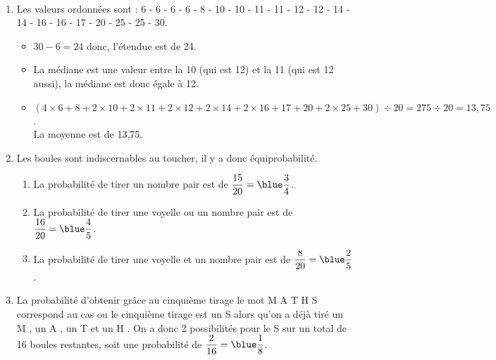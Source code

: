 \ \\ [-5mm]
   \begin{enumerate}
      \item Les valeurs ordonnées sont : 6 - 6 - 6 - 6 - 8 - 10 - 10 - 11 - 11 - 12 - 12 - 14 - 14 - 16 - 16 - 17 - 20 - 25 - 25 - 30.
         \begin{itemize}
            \item $30-6 =24$ donc, {\blue l'étendue est de 24}.
            \item La médiane est une valeur entre la 10 (qui est 12) et la 11 (qui est 12 aussi), {\blue la médiane est donc égale à 12}.
            \item $(4\times6+8+2\times10+2\times11+2\times12+2\times14+2\times16+17+20+2\times25+30)\div20 =275\div20 =13,75$. \\
               {\blue La moyenne est de 13,75}.
         \end{itemize}
      \item Les boules sont indiscernables au toucher, il y a donc équiprobabilité. \\ [1mm]
         \begin{enumerate}
            \item {\blue La probabilité de \og tirer un nombre pair \fg{} est de} $\dfrac{15}{20} ={\blue \dfrac34}$.
            \item {\blue La probabilité de \og tirer une voyelle ou un nombre pair \fg{} est de} $\dfrac{16}{20} ={\blue \dfrac45}$. \smallskip
            \item {\blue La probabilité de \og tirer une voyelle et un nombre pair \fg{} est de} $\dfrac{8}{20} ={\blue \dfrac25}$. \smallskip
         \end{enumerate}
      \setcounter{enumi}{2}
      \item La probabilité d’obtenir grâce au cinquième tirage le mot \og M A T H S \fg{} correspond au cas ou le cinquième tirage est un \og S \fg{} alors qu'on a déjà tiré un \og M \fg, un \og A \fg, un \og T \fg{} et un \og H \fg. On a donc 2 possibilités pour le \og S \fg{} sur un total de 16 boules restantes, soit une probabilité de $\dfrac{2}{16} ={\blue \dfrac18}$.
   \end{enumerate}

